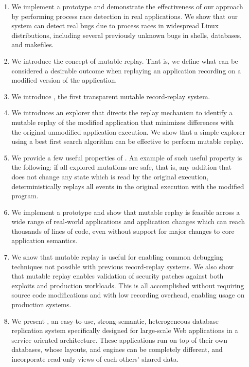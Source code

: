 \begin{enumerate}
\item We implement a \racepro prototype and demonstrate the effectiveness of our
approach by performing process race detection in real applications. We show that
our system can detect \nracepro real bugs due to process races in widespread
Linux distributions, including several previously unknown bugs in shells,
databases, and makefiles.

\item We introduce the concept of mutable replay. That is, we define what can be
considered a desirable outcome when replaying an application recording on a
modified version of the application.

\item We introduce \dora, the first transparent mutable record-replay system.

\item We introduces an explorer that directs the replay mechanism to
identify a mutable replay of the modified application that minimizes differences
with the original unmodified application execution. We show that a simple
explorer using a best first search algorithm can be effective to perform
mutable replay.

\item We provide a few useful properties of \dora. An example of such useful
property is the following: if all explored mutations are safe, that is, any
addition that does not change any state which is read by the original
execution, {\dora} deterministically replays all events in the original
execution with the modified program.

\item We implement a \dora prototype and show that mutable
replay is feasible across a wide range of real-world applications and
application changes which can reach thousands of lines of code, even
without support for major changes to core application semantics.

\item We show that mutable replay is useful for enabling common debugging
techniques not possible with previous record-replay systems.  We
also show that mutable replay enables validation of security patches
against both exploits and production workloads. This is all
accomplished without requiring source code modifications and with low
recording overhead, enabling usage on production systems.

\item We present \synapse, an easy-to-use, strong-semantic, heterogeneous
database replication system specifically designed for large-scale Web
applications in a service-oriented architecture.
These applications run on top of their own databases, whose layouts, and engines
can be completely different, and incorporate read-only views of each others'
shared data.


\end{enumerate}
